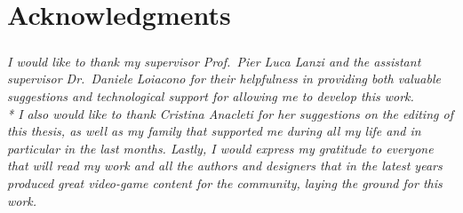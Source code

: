 \chapter*{Acknowledgments}
\paragraph{} \textit{
	I would like to thank my supervisor Prof.~Pier Luca Lanzi and the assistant supervisor Dr.~Daniele Loiacono for their helpfulness in providing both valuable suggestions and technological support for allowing me to develop this work. 
	\\* I also would like to thank Cristina Anacleti for her suggestions on the editing of this thesis, as well as my family that supported me during all my life and in particular in the last months. Lastly, I would express my gratitude to everyone that will read my work and all the authors and designers that in the latest years produced great video-game content for the community, laying the ground for this work.
	}